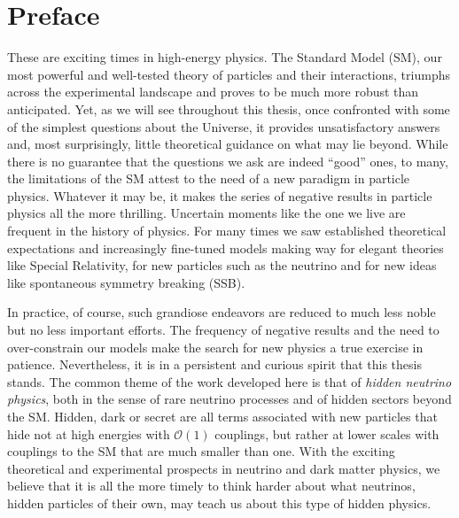 \documentclass[openany,twoside,frontopenright,chaprunninghead]{ip3thesis}
\begin{document}


\cleardoublepage

\begin{epigraph*}
% 
% 
\end{epigraph*} 


\chapter*{Preface}

These are exciting times in high-energy physics. The Standard Model (SM), our most powerful and well-tested theory of particles and their interactions, triumphs across the experimental landscape and proves to be much more robust than anticipated. Yet, as we will see throughout this thesis, once confronted with some of the simplest questions about the Universe, it provides unsatisfactory answers and, most surprisingly, little theoretical guidance on what may lie beyond. While there is no guarantee that the questions we ask are indeed ``good'' ones, to many, the limitations of the SM attest to the need of a new paradigm in particle physics. Whatever it may be, it makes the series of negative results in particle physics all the more thrilling. Uncertain moments like the one we live are frequent in the history of physics. For many times we saw established theoretical expectations and increasingly fine-tuned models making way for elegant theories like Special Relativity, for new particles such as the neutrino and for new ideas like spontaneous symmetry breaking (SSB).

In practice, of course, such grandiose endeavors are reduced to much less noble but no less important efforts. The frequency of negative results and the need to over-constrain our models make the search for new physics a true exercise in patience. Nevertheless, it is in a persistent and curious spirit that this thesis stands. The common theme of the work developed here is that of \emph{hidden neutrino physics}, both in the sense of rare neutrino processes and of hidden sectors beyond the SM. Hidden, dark or secret are all terms associated with new particles that hide not at high energies with $\mathscr{O}(1)$ couplings, but rather at lower scales with couplings to the SM that are much smaller than one. With the exciting theoretical and experimental prospects in neutrino and dark matter physics, we believe that it is all the more timely to think harder about what neutrinos, hidden particles of their own, may teach us about this type of hidden physics. 
\end{document}
